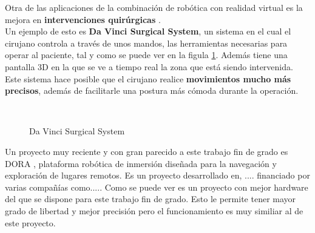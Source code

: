 \documentclass[twoside, 11pt]{epstfg}
\begin{document}
Otra de las aplicaciones de la combinación de robótica con realidad virtual es la mejora en \textbf{intervenciones quirúrgicas} \cite{connolly2014validation}.\\
Un ejemplo de esto es \textbf{Da Vinci Surgical System}, un sistema en el cual el cirujano controla a través de unos mandos, las herramientas necesarias para operar al paciente, tal y como se puede ver en la figula \ref{daVinci}. Además tiene una pantalla 3D en la que se ve a tiempo real la zona que está siendo intervenida.
Este sistema hace posible que el cirujano realice \textbf{movimientos mucho más precisos}, además de facilitarle una postura más cómoda durante la operación. \cite{Hubens2003}


\begin{figure}[H]
	\centering
	\\
	\caption{Da Vinci Surgical System}
	 \label{daVinci}
\end{figure}


Un proyecto muy reciente y con gran parecido a este trabajo fin de grado es DORA \cite{DORA}, plataforma robótica de inmersión diseñada para la navegación y exploración de lugares remotos. Es un proyecto desarrollado en, .... financiado por varias compañías como..... Como se puede ver es un proyecto con mejor hardware del que se dispone para este trabajo fin de grado. Esto le permite tener mayor grado de libertad y mejor precisión pero el funcionamiento es muy similiar al de este proyecto.
\end{document}
